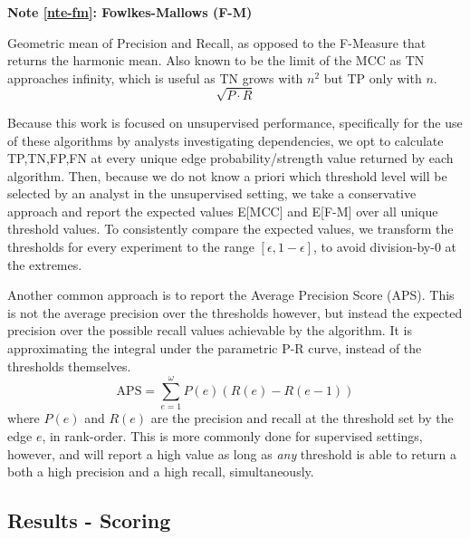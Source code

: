 \documentclass[%
	12pt,
		oneside,
		letterpaper
]{book}
\newcounter{quartocalloutnteno}
\newcommand{\quartocalloutnte}[1]{\refstepcounter{quartocalloutnteno}\label{#1}}
\begin{document}
\begin{tcolorbox}[enhanced jigsaw, colback=white, arc=.35mm, toprule=.15mm, opacityback=0, colframe=quarto-callout-note-color-frame, bottomrule=.15mm, rightrule=.15mm, leftrule=.75mm, left=2mm, breakable]

\quartocalloutnte{nte-fm} 

\vspace{-3mm}\textbf{Note \ref*{nte-fm}: Fowlkes-Mallows (F-M)}\vspace{3mm}

Geometric mean of Precision and Recall, as opposed to the F-Measure that
returns the harmonic mean. Also known to be the limit of the MCC as TN
approaches infinity\autocite{MCCapproachesgeometric_Crall2023}, which is
useful as TN grows with \(n^2\) but TP only with \(n\).
\[\sqrt{P\cdot R}\]

\end{tcolorbox}

Because this work is focused on unsupervised performance, specifically
for the use of these algorithms by analysts investigating dependencies,
we opt to calculate TP,TN,FP,FN at every unique edge
probability/strength value returned by each algorithm. Then, because we
do not know a priori which threshold level will be selected by an
analyst in the unsupervised setting, we take a conservative approach and
report the expected values E{[}MCC{]} and E{[}F-M{]} over all unique
threshold values. To consistently compare the expected values, we
transform the thresholds for every experiment to the range
\([\epsilon, 1-\epsilon]\), to avoid division-by-0 at the extremes.

Another common approach is to report the Average Precision Score (APS).
This is not the average precision over the thresholds however, but
instead the expected precision over the possible recall values
achievable by the algorithm. It is approximating the integral under the
parametric P-R curve, instead of the thresholds themselves.
\[\text{APS} = \sum_{e=1}^{\omega} P(e)(R(e)-R(e-1))\] where \(P(e)\)
and \(R(e)\) are the precision and recall at the threshold set by the
edge \(e\), in rank-order. This is more commonly done for supervised
settings, however, and will report a high value as long as \emph{any}
threshold is able to return a both a high precision and a high recall,
simultaneously.

\subsection{Results - Scoring}\label{results---scoring}
\end{document}
